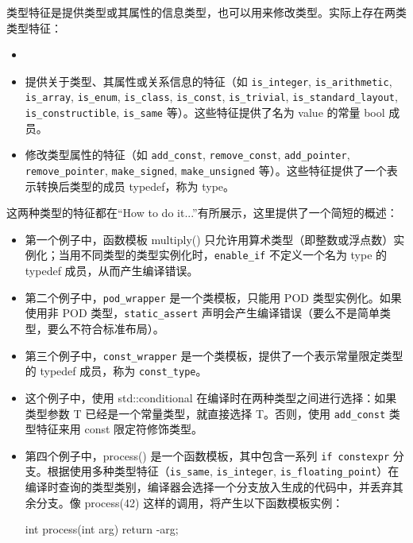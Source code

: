 类型特征是提供类型或其属性的信息类型，也可以用来修改类型。实际上存在两类类型特征：

\begin{itemize}
\item
\item 提供关于类型、其属性或关系信息的特征（如 \verb|is_integer|, \verb|is_arithmetic|, \verb|is_array|, \verb|is_enum|, \verb|is_class|, \verb|is_const|, \verb|is_trivial|, \verb|is_standard_layout|, \verb|is_constructible|, \verb|is_same| 等）。这些特征提供了名为 value 的常量 bool 成员。

\item
修改类型属性的特征（如 \verb|add_const|, \verb|remove_const|, \verb|add_pointer|, \verb|remove_pointer|, \verb|make_signed|, \verb|make_unsigned| 等）。这些特征提供了一个表示转换后类型的成员 typedef，称为 type。
\end{itemize}

这两种类型的特征都在“How to do it...”有所展示，这里提供了一个简短的概述：

\begin{itemize}
\item
第一个例子中，函数模板 multiply() 只允许用算术类型（即整数或浮点数）实例化；当用不同类型的类型实例化时，\verb|enable_if| 不定义一个名为 type 的 typedef 成员，从而产生编译错误。

\item
第二个例子中，\verb|pod_wrapper| 是一个类模板，只能用 POD 类型实例化。如果使用非 POD 类型，\verb|static_assert| 声明会产生编译错误（要么不是简单类型，要么不符合标准布局）。

\item
第三个例子中，\verb|const_wrapper| 是一个类模板，提供了一个表示常量限定类型的 typedef 成员，称为 \verb|const_type|。

\item
这个例子中，使用 std::conditional 在编译时在两种类型之间进行选择：如果类型参数 T 已经是一个常量类型，就直接选择 T。否则，使用 \verb|add_const| 类型特征来用 const 限定符修饰类型。

\item
第四个例子中，process() 是一个函数模板，其中包含一系列 \verb|if constexpr| 分支。根据使用多种类型特征（\verb|is_same|, \verb|is_integer|, \verb|is_floating_point|）在编译时查询的类型类别，编译器会选择一个分支放入生成的代码中，并丢弃其余分支。像 process(42) 这样的调用，将产生以下函数模板实例：

\begin{cpp}
int process(int arg)
{
    return -arg;
}
\end{cpp}
\end{itemize}

